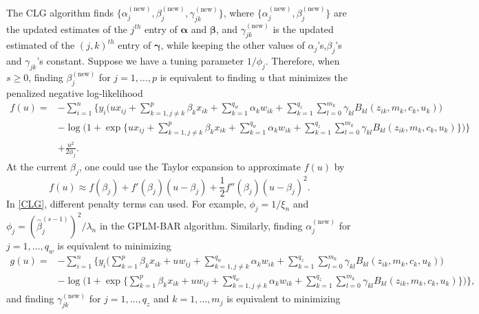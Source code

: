 \documentclass[11pt]{article}
\begin{document}
The CLG algorithm finds $\{\alpha^{(\text{new})}_j,\beta^{(\text{new})}_j,\gamma^{(\text{new})}_{jk} \}$, where $\{\alpha^{(\text{new})}_j,\beta^{(\text{new})}_j \}$ are the updated estimates of the $j^{th}$ entry of $\boldsymbol{\alpha}$ and $\boldsymbol{\beta}$, and $\gamma^{(\text{new})}_{jk}$ is the updated estimated of the $(j,k)^{th}$ entry of $\boldsymbol{\gamma}$, while keeping the other values of $\alpha_j$'s,$\beta_j$'s and $\gamma_{jk}$'s constant. Suppose we have a tuning parameter $1/\phi_j$. Therefore, when $s \geq 0$, finding $\beta^{(\text{new})}_j$ for $j=1,\ldots,p$ is equivalent to finding $u$ that minimizes the penalized negative log-likelihood
\begin{equation}\label{CLG}
\begin{split}
f(u) = & - \sum^n_{i=1} \bigg\{ y_i \Big(u x_{ij} + \sum^p_{k=1, j \neq k} \beta_k x_{ik} + \sum^{q_w}_{k=1} \alpha_k w_{ik} + \sum^{q_z}_{k=1} \sum^{m_k}_{l=0} \gamma_{kl} B_{kl}(z_{ik},m_k,c_k,u_k)\Big) \\
  &- \log \Big(1+\exp\big\{ u x_{ij} + \sum^p_{k=1, j \neq k} \beta_k x_{ik} + \sum^{q_w}_{k=1} \alpha_k w_{ik} + \sum^{q_z}_{k=1} \sum^{m_k}_{l=0} \gamma_{kl} B_{kl}(z_{ik},m_k,c_k,u_k) \big\} \Big) \bigg\} \\
  & + \frac{u^2}{2\phi_j}.
\end{split}
\end{equation}
At the current $\beta_j$, one could use the Taylor expansion to approximate $f(u)$ by
$$
f(u) \approx f(\beta_j) + f'(\beta_j)(u-\beta_j) + \frac{1}{2}f''(\beta_j)(u-\beta_j)^2.
$$ 
In \eqref{CLG}, different penalty terms can used. For example, $\phi_j = 1/\xi_n$ and $\phi_j = (\widehat{\beta}^{(s-1)}_j)^2/ \lambda_n$ in the GPLM-BAR algorithm. Similarly, finding $\alpha^{(\text{new})}_j$ for $j=1,\ldots,q_w$ is equivalent to minimizing
\begin{equation*}
\begin{split}
g(u) = & - \sum^n_{i=1} \bigg\{ y_i \Big(\sum^p_{k=1} \beta_k x_{ik} + u w_{ij} + \sum^{q_w}_{k=1, j \neq k} \alpha_k w_{ik} + \sum^{q_z}_{k=1} \sum^{m_k}_{l=0} \gamma_{kl} B_{kl}(z_{ik},m_k,c_k,u_k) \Big) \\
& - \log\Big(1+\exp\big\{ \sum^p_{k=1} \beta_k x_{ik} + u w_{ij} + \sum^{q_w}_{k=1, j \neq k} \alpha_k w_{ik} + \sum^{q_z}_{k=1} \sum^{m_k}_{l=0} \gamma_{kl} B_{kl}(z_{ik},m_k,c_k,u_k) \big\}\Big) \bigg\},
\end{split}
\end{equation*}
and finding $\gamma^{(\text{new})}_{jk}$ for $j=1,\ldots,q_z$ and $k=1,\ldots,m_j$ is equivalent to minimizing
\end{document}

